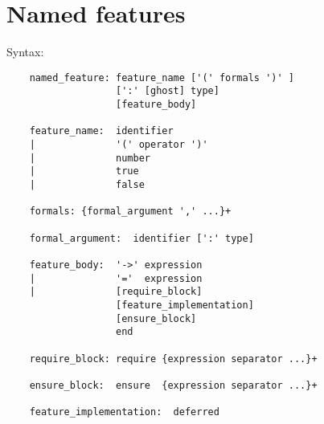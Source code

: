 \section{Named features}

\noindent Syntax:
\begin{lstlisting}
    named_feature: feature_name ['(' formals ')' ]
                   [':' [ghost] type]
                   [feature_body]

    feature_name:  identifier
    |              '(' operator ')'
    |              number
    |              true
    |              false

    formals: {formal_argument ',' ...}+

    formal_argument:  identifier [':' type]

    feature_body:  '->' expression
    |              '='  expression
    |              [require_block]
                   [feature_implementation]
                   [ensure_block]
                   end

    require_block: require {expression separator ...}+

    ensure_block:  ensure  {expression separator ...}+

    feature_implementation:  deferred
\end{lstlisting}

